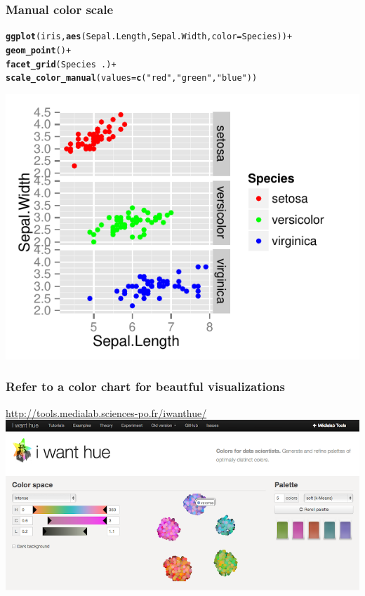 \documentclass{beamer}\usepackage[]{graphicx}\usepackage[]{color}
\makeatletter
\newcommand{\hlstr}[1]{\textcolor[rgb]{0.192,0.494,0.8}{#1}}%
\newcommand{\hlopt}[1]{\textcolor[rgb]{0,0,0}{#1}}%
\newcommand{\hlstd}[1]{\textcolor[rgb]{0.345,0.345,0.345}{#1}}%
\newcommand{\hlkwc}[1]{\textcolor[rgb]{0.333,0.667,0.333}{#1}}%
\newcommand{\hlkwd}[1]{\textcolor[rgb]{0.737,0.353,0.396}{\textbf{#1}}}%
\newenvironment{kframe}{%
 \def\at@end@of@kframe{}%
 \ifinner\ifhmode%
  \def\at@end@of@kframe{\end{minipage}}%
  \begin{minipage}{\columnwidth}%
 \fi\fi%
 \def\FrameCommand##1{\hskip\@totalleftmargin \hskip-\fboxsep
 \colorbox{shadecolor}{##1}\hskip-\fboxsep
     \hskip-\linewidth \hskip-\@totalleftmargin \hskip\columnwidth}%
 \MakeFramed {\advance\hsize-\width
   \@totalleftmargin\z@ \linewidth\hsize
   \@setminipage}}%
 {\par\unskip\endMakeFramed%
 \at@end@of@kframe}
\newenvironment{knitrout}{}{} %
\makeatother
\begin{document}
\begin{frame}[fragile]
\frametitle{Manual color scale}
\begin{knitrout}\footnotesize
{}\color{fgcolor}\begin{kframe}
\begin{alltt}
\hlkwd{ggplot}\hlstd{(iris,} \hlkwd{aes}\hlstd{(Sepal.Length, Sepal.Width,} \hlkwc{color} \hlstd{= Species))} \hlopt{+}
    \hlkwd{geom_point}\hlstd{()} \hlopt{+}
    \hlkwd{facet_grid}\hlstd{(Species} \hlopt{~} \hlstd{.)} \hlopt{+}
    \hlkwd{scale_color_manual}\hlstd{(}\hlkwc{values} \hlstd{=} \hlkwd{c}\hlstd{(}\hlstr{"red"}\hlstd{,} \hlstr{"green"}\hlstd{,} \hlstr{"blue"}\hlstd{))}
\end{alltt}
\end{kframe}

{\centering \includegraphics[width=.75\linewidth]{figure/facetgridcolors} 

}



\end{knitrout}
\end{frame}


\begin{frame}[fragile]
\frametitle{Refer to a color chart for beautful visualizations}
\begin{center}
\url{http://tools.medialab.sciences-po.fr/iwanthue/}
\newline
\newline
\includegraphics[scale=0.25]{images/color_schemes.png}
\end{center}
\end{frame}
\end{document}
